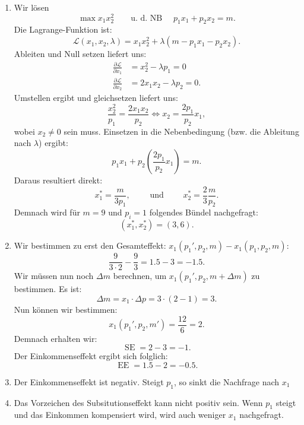 \begin{solution}

	\begin{enumerate}
		\item Wir lösen
		      \[
			      \max x_1 x_2^2 \qquad \text{u. d. NB } \quad p_1 x_1 + p_2 x_2 = m
			      .\]
		      Die Lagrange-Funktion ist:
		      \[
			      \mathcal{L}(x_1,x_2,\lambda) = x_1x_2^2 + \lambda \left( m - p_1 x_1 -p_2 x_2 \right)
			      .\]
		      Ableiten und Null setzen liefert uns:
		      \begin{align*}
			      \frac{\partial \mathcal{L}}{\partial x_1} & =  x_2^2 - \lambda p_1 = 0    \\
			      \frac{\partial \mathcal{L}}{\partial x_2} & =  2x_1x_2 - \lambda p_2 = 0.
		      \end{align*}
		      Umstellen ergibt und gleichsetzen liefert uns:
		      \[
			      \frac{x_2^2}{p_1} = \frac{2x_1x_2}{p_2} \iff x_2 = \frac{2 p_1}{p_2}x_1
			      ,\]
		      wobei $x_2 \neq 0$  sein muss.
		      Einsetzen in die Nebenbedingung (bzw. die Ableitung nach $\lambda$) ergibt:
		      \[
			      p_1 x_1 + p_2 \left( \frac{2p_1}{p_2}x_1 \right) =m
			      .\]
		      Daraus resultiert direkt:
		      \[
			      x_1^* = \frac{m}{3p_1} , \qquad \text{ und } \qquad x_2^* = \frac{2}{3} \frac{m}{p_2}
			      .\]
		      Demnach wird für $m=9$ und $p_i = 1$ folgendes Bündel nachgefragt:
		      \[
			      (x_1^*,x_2^*) = (3,6)
			      .\]
		\item Wir bestimmen zu erst den Gesamteffekt: $x_1(p_1',p_2,m) - x_1(p_1,p_2,m)$:
		      \[
			      \frac{9}{3\cdot 2} - \frac{9}{3} = 1.5 - 3=  -1.5
			      .\]
		      Wir müssen nun noch $\Delta m$ berechnen, um $x_1(p_1',p_2,m + \Delta m)$ zu bestimmen.
		      Es ist:
		      \[
			      \Delta m = x_1 \cdot \Delta p = 3 \cdot (2-1) = 3
			      .\]
		      Nun können wir bestimmen:
		      \[
			      x_1(p_1',p_2,m')= \frac{12}{6} = 2
			      .\]
		      Demnach erhalten wir:
		      \[
			      \operatorname{SE} = 2 - 3 = -1
			      .\]
		      Der Einkommenseffekt ergibt sich folglich:
		      \[
			      \operatorname{EE} =  1.5 - 2 = -0.5
			      .\]
		\item Der Einkommenseffekt ist negativ. Steigt $p_1$, so sinkt die Nachfrage nach $x_1$
		\item Das Vorzeichen des Subsitutionseffekt kann nicht positiv sein. Wenn $p_1$ steigt und das Einkommen kompensiert wird, wird auch weniger $x_1$ nachgefragt.
	\end{enumerate}

\end{solution}



